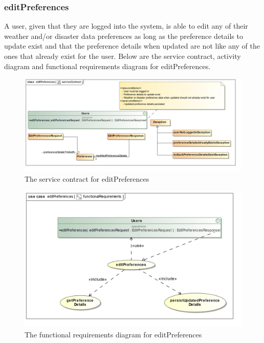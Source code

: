 \subsubsection{editPreferences}

A user, given that they are logged into the system, is able to edit any of their weather and/or disaster data preferences as long as the preference details to update exist and that the preference details when updated are not like any of the ones that already exist for the user. Below are the service contract, activity diagram and functional requirements diagram for editPreferences.

\begin{figure}[H]
	\centering
	\includegraphics[scale=0.19]{../images/funcReq/editPreferencesServiceContract.jpg}
	\caption{The service contract for editPreferences \label{overflow}}
\end{figure}

\begin{figure}[H]
	\centering
	\includegraphics[width=1.1\textwidth]{../images/funcReq/editPreferencesFunctionalRequirements.jpg}
	\caption{The functional requirements diagram for editPreferences \label{overflow}}
\end{figure}


